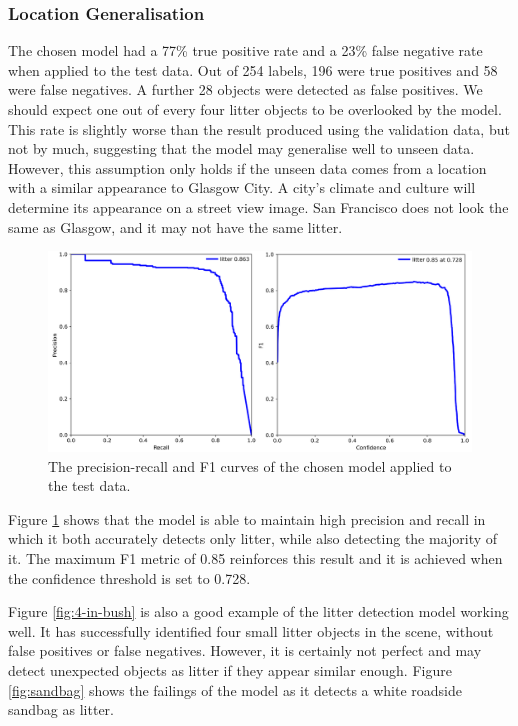 \documentclass{thesis}
\begin{document}
\subsubsection{Location Generalisation}

The chosen model had a 77\% true positive rate and a 23\% false negative rate when applied to the test data. Out of 254 labels, 196 were true positives and 58 were false negatives. A further 28 objects were detected as false positives. We should expect one out of every four litter objects to be overlooked by the model. This rate is slightly worse than the result produced using the validation data, but not by much, suggesting that the model may generalise well to unseen data. However, this assumption only holds if the unseen data comes from a location with a similar appearance to Glasgow City. A city's climate and culture will determine its appearance on a street view image. San Francisco does not look the same as Glasgow, and it may not have the same litter.

\begin{figure}[h!]
    \centering
    \includegraphics[scale=0.3]{images/fm-prf1-curves.png}
    \caption{The precision-recall and F1 curves of the chosen model applied to the test data.}
    \label{fig:fm-prf1-curve}
\end{figure}

Figure \ref{fig:fm-prf1-curve} shows that the model is able to maintain high precision and recall in which it both accurately detects only litter, while also detecting the majority of it. The maximum F1 metric of 0.85 reinforces this result and it is achieved when the confidence threshold is set to 0.728.

Figure \ref{fig:4-in-bush} is also a good example of the litter detection model working well. It has successfully identified four small litter objects in the scene, without false positives or false negatives. However, it is certainly not perfect and may detect unexpected objects as litter if they appear similar enough. Figure \ref{fig:sandbag} shows the failings of the model as it detects a white roadside sandbag as litter.
\end{document}
